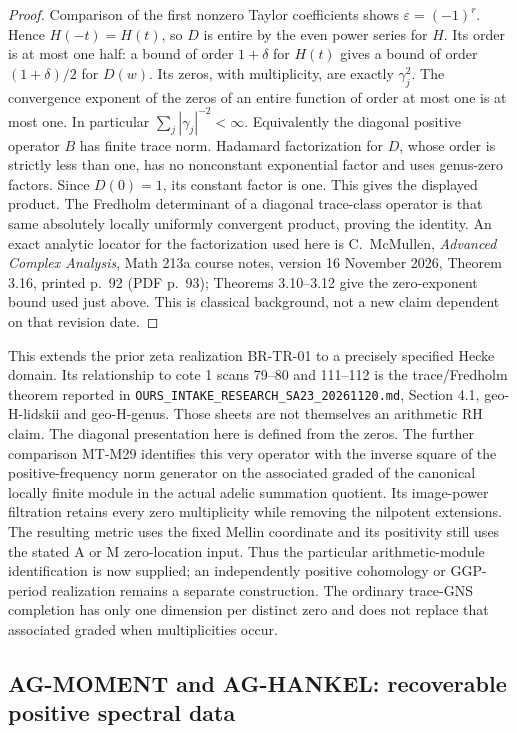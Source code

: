 \begin{proof}
Comparison of the first nonzero Taylor coefficients shows
$\varepsilon=(-1)^r$. Hence $H(-t)=H(t)$, so $D$ is entire by the even
power series for $H$. Its order is at most one half: a bound of order
$1+\delta$ for $H(t)$ gives a bound of order $(1+\delta)/2$ for $D(w)$.
Its zeros, with multiplicity, are exactly $\gamma_j^2$.
The convergence exponent of the zeros of an entire function of order at
most one is at most one. In particular
$\sum_j|\gamma_j|^{-2}<\infty$. Equivalently the diagonal positive
operator $B$ has finite trace norm. Hadamard factorization for $D$, whose
order is strictly less than one, has no nonconstant exponential factor
and uses genus-zero factors. Since $D(0)=1$, its constant factor is one.
This gives the displayed product. The Fredholm determinant of a diagonal
trace-class operator is that same absolutely locally uniformly convergent
product, proving the identity. An exact analytic locator for the
factorization used here is C.~McMullen, \emph{Advanced Complex Analysis},
Math 213a course notes, version 16 November 2026, Theorem 3.16,
printed p.~92 (PDF p.~93); Theorems 3.10--3.12 give the zero-exponent
bound used just above. This is classical background, not a new claim
dependent on that revision date.
\end{proof}

This extends the prior zeta realization BR-TR-01 to a precisely specified
Hecke domain. Its relationship to cote 1 scans 79--80 and 111--112 is
the trace/Fredholm theorem reported in
\texttt{OURS\_INTAKE\_RESEARCH\_SA23\_20261120.md}, Section 4.1,
geo-H-lidskii and geo-H-genus. Those sheets are not themselves an
arithmetic RH claim. The diagonal presentation here is defined from
the zeros. The further comparison MT-M29 identifies this very operator
with the inverse square of the positive-frequency norm generator on
the associated graded of the canonical locally finite module in the
actual adelic summation quotient. Its image-power filtration retains
every zero multiplicity while removing the nilpotent extensions.
The resulting metric uses the fixed Mellin coordinate and its
positivity still uses the stated A or M zero-location input.
Thus the particular arithmetic-module identification is now supplied;
an independently positive cohomology or GGP-period realization remains
a separate construction. The ordinary trace-GNS completion has only
one dimension per distinct zero and does not replace that associated
graded when multiplicities occur.

\subsection{AG-MOMENT and AG-HANKEL: recoverable positive spectral data}
\label{ag:moment}

